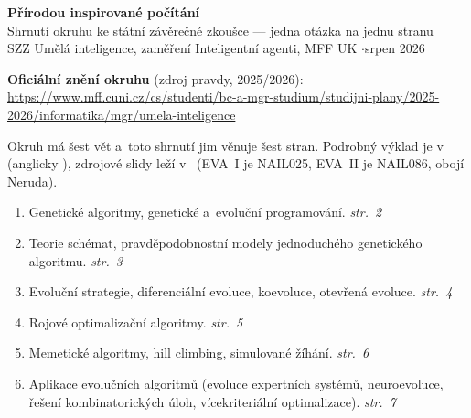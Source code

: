 \documentclass[10pt,a4paper]{article}
\begin{document}
\raggedcolumns   %

\thispagestyle{empty}
\begin{center}
{\LARGE\bfseries Přírodou inspirované počítání}\\[0.35em]
{\large Shrnutí okruhu ke státní závěrečné zkoušce --- jedna otázka na jednu stranu}\\[0.5em]
{\small SZZ Umělá inteligence, zaměření Inteligentní agenti, MFF UK \quad$\cdot$\quad srpen 2026}
\end{center}

\begin{qbox}{}
\small\raggedright
\textbf{Oficiální znění okruhu} (zdroj pravdy, 2025/2026):
{\footnotesize\url{https://www.mff.cuni.cz/cs/studenti/bc-a-mgr-studium/studijni-plany/2025-2026/informatika/mgr/umela-inteligence}}
\end{qbox}

\footnotesize
Okruh má šest vět a~toto shrnutí jim věnuje šest stran. Podrobný výklad je
v~ (anglicky ),
zdrojové slidy leží v~ (EVA~I je NAIL025, EVA~II je NAIL086, obojí Neruda).

\begin{enumerate}[leftmargin=2em,itemsep=1pt]
\item Genetické algoritmy, genetické a~evoluční programování. \hfill \textit{str.~2}
\item Teorie schémat, pravděpodobnostní modely jednoduchého genetického algoritmu.
  \hfill \textit{str.~3}
\item Evoluční strategie, diferenciální evoluce, koevoluce, otevřená evoluce. \hfill \textit{str.~4}
\item Rojové optimalizační algoritmy. \hfill \textit{str.~5}
\item Memetické algoritmy, hill climbing, simulované žíhání. \hfill \textit{str.~6}
\item Aplikace evolučních algoritmů (evoluce expertních systémů, neuroevoluce, řešení
  kombinatorických úloh, vícekriteriální optimalizace). \hfill \textit{str.~7}
\end{enumerate}
\end{document}
